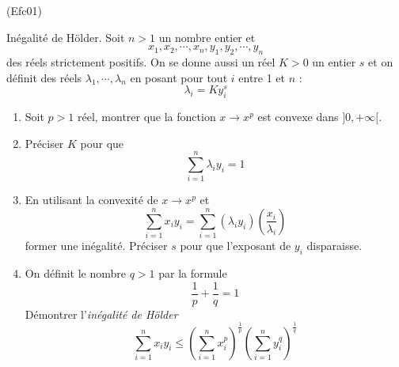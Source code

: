 \begin{tiny}(Efc01)\end{tiny}
Inégalité de H\"{o}lder.\newline
Soit $n>1$ un nombre entier et 
\begin{displaymath}
x_1,x_2,\cdots , x_n, y_1, y_2, \cdots , y_n 
\end{displaymath}
des réels strictement positifs. On se donne aussi un réel $K>0$ un entier $s$ et on définit des réels $\lambda_1,\cdots,\lambda_n$ en posant pour tout $i$ entre 1 et $n$ :
\[\lambda_i=Ky_{i}^{s}\]
  \begin{enumerate}
     \item Soit $p>1$ réel, montrer que la fonction $x\rightarrow x^p$ est convexe dans $]0,+\infty[$.
     \item Préciser $K$ pour que
     \[\sum_{i=1}^{n}\lambda_iy_i=1 \]
     \item En utilisant la convexité de $x\rightarrow x^p$ et
     \[\sum_{i=1}^{n}x_iy_i=\sum_{i=1}^{n}(\lambda_iy_i)(\frac{x_i}{\lambda_i})\]
     former une inégalité. Préciser $s$ pour que l'exposant de $y_i$ disparaisse.
     \item On définit le nombre $q>1$ par la formule
     \[\frac{1}{p}+\frac{1}{q}=1\]
     Démontrer l'\emph{inégalité de H\"{o}lder}
     \[\sum_{i=1}^{n}x_iy_i \leq \left( \sum_{i=1}^{n}x_{i}^{p}\right) ^{\frac{1}{p}}\left( \sum_{i=1}^{n}y_{i}^{q}\right) ^{\frac{1}{q}}\]
\end{enumerate}